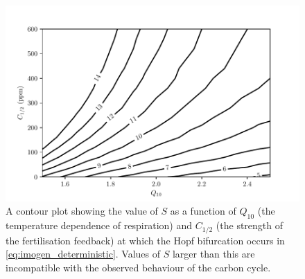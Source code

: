 \begin{figure}
  \centering
  \includegraphics[keepaspectratio,width=\textwidth]{imogen_critical_S_Q10_ca05}
  \caption[The dependence of the critical values of $S$ on $Q_{10}$ and $C_{1/2}$]{A contour plot showing the value of $S$ as a function of $Q_{10}$ (the temperature dependence of respiration)
    and $C_{1/2}$ (the strength of the  fertilisation
    feedback) at which the Hopf bifurcation occurs in \cref{eq:imogen_deterministic}.
    Values of $S$ larger than  this are incompatible with the observed behaviour of the carbon cycle.}
  \label{fig:imogen_bifurcation_plane}
\end{figure}


